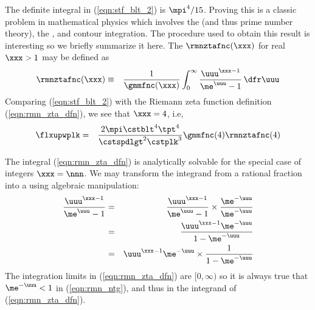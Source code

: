 \documentclass[12pt]{article}
\begin{document}
The definite integral in (\ref{eqn:stf_blt_2}) is $\mpi^{4}/15$. 
Proving this is a classic problem in mathematical physics which
involves the  (and thus prime number
theory), the , and contour integration.
The procedure used to obtain this result is interesting so we briefly
summarize it here.
The  $\rmnztafnc(\xxx)$ for real $\xxx > 1$
may be defined as
\begin{eqnarray}
\rmnztafnc(\xxx) & \equiv & \frac{1}{\gmmfnc(\xxx)}
\int_{0}^{\infty} \frac{\uuu^{\xxx-1}}{\me^{\uuu}-1} \,\dfr\uuu
\label{eqn:rmn_zta_dfn}
\end{eqnarray}
Comparing (\ref{eqn:stf_blt_2}) with the Riemann zeta function
definition (\ref{eqn:rmn_zta_dfn}), we see that $\xxx=4$, i.e, 
\begin{eqnarray}
\flxupwplk 
& = & \frac{2 \mpi \cstblt^{4} \tpt^{4} }{\cstspdlgt^{2} \cstplk^{3}} 
\gmmfnc(4)\rmnztafnc(4)
\label{eqn:stf_blt_rmn}
\end{eqnarray}

The integral (\ref{eqn:rmn_zta_dfn}) is analytically solvable for 
the special case of integers $\xxx = \nnn$.
We may transform the integrand from a rational fraction into a
 using algebraic manipulation:
\begin{eqnarray}
\frac{\uuu^{\xxx-1}}{\me^{\uuu}-1} 
& = & \frac{\uuu^{\xxx-1}}{\me^{\uuu}-1} \times \frac{\me^{-\uuu}}{\me^{-\uuu}} \nonumber \\
& = & \frac{\uuu^{\xxx-1}\me^{-\uuu}}{1-\me^{-\uuu}} \nonumber \\
& = & \uuu^{\xxx-1}\me^{-\uuu} \times \frac{1}{1-\me^{-\uuu}}
\label{eqn:rmn_ntg}
\end{eqnarray}
The integration limits in (\ref{eqn:rmn_zta_dfn}) are $[0,\infty)$
so it is always true that $\me^{-\uuu} < 1$ in (\ref{eqn:rmn_ntg}),
and thus in the integrand of (\ref{eqn:rmn_zta_dfn}).
\end{document}
